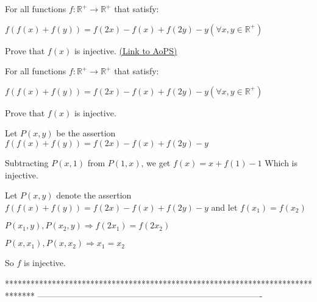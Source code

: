 \begin{problem}
	For all functions $f:\mathbb{R}^{+} \to \mathbb{R}^{+}$ that satisfy:

$f(f(x)+f(y))=f(2x)-f(x)+f(2y)-y(\forall x,y \in \mathbb{R}^{+})$

Prove that $f(x)$ is injective.
	\flushright \href{https://artofproblemsolving.com/community/c6h1620559}{(Link to AoPS)}
\end{problem}



\begin{solution}
	\begin{tcolorbox}For all functions $f:\mathbb{R}^{+} \to \mathbb{R}^{+}$ that satisfy:

$f(f(x)+f(y))=f(2x)-f(x)+f(2y)-y(\forall x,y \in \mathbb{R}^{+})$

Prove that $f(x)$ is injective.\end{tcolorbox}
Let $P(x,y)$ be the assertion $f(f(x)+f(y))=f(2x)-f(x)+f(2y)-y$

Subtracting $P(x,1)$ from $P(1,x)$, we get $f(x)=x+f(1)-1$
Which is injective.


\end{solution}






\begin{solution}
	Let $P(x,y)$ denote the assertion $f(f(x)+f(y))=f(2x)-f(x)+f(2y)-y$ and let $f(x_1)=f(x_2)$

$P(x_1,y),P(x_2,y) \Rightarrow f(2x_1)=f(2x_2)$

$P(x,x_1),P(x,x_2) \Rightarrow x_1=x_2$

So $f$ is injective.
\end{solution}
*******************************************************************************
-------------------------------------------------------------------------------

